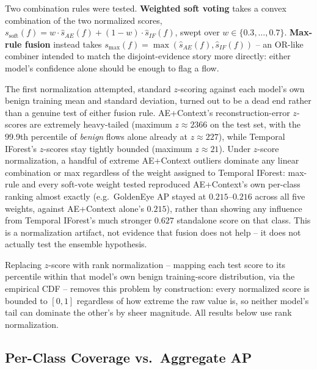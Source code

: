 Two combination rules were tested. \textbf{Weighted soft voting} takes a convex combination of the two normalized scores, $s_{\text{soft}}(f) = w \cdot \hat{s}_{AE}(f) + (1-w) \cdot \hat{s}_{IF}(f)$, swept over $w \in \{0.3, \dots, 0.7\}$. \textbf{Max-rule fusion} instead takes $s_{\text{max}}(f) = \max(\hat{s}_{AE}(f), \hat{s}_{IF}(f))$ -- an OR-like combiner intended to match the disjoint-evidence story more directly: either model's confidence alone should be enough to flag a flow.

The first normalization attempted, standard $z$-scoring against each model's own benign training mean and standard deviation, turned out to be a dead end rather than a genuine test of either fusion rule. AE+Context's reconstruction-error $z$-scores are extremely heavy-tailed (maximum $z \approx 2366$ on the test set, with the 99.9th percentile of \emph{benign} flows alone already at $z \approx 227$), while Temporal IForest's $z$-scores stay tightly bounded (maximum $z \approx 21$). Under $z$-score normalization, a handful of extreme AE+Context outliers dominate any linear combination or max regardless of the weight assigned to Temporal IForest: max-rule and every soft-vote weight tested reproduced AE+Context's own per-class ranking almost exactly (e.g.\ GoldenEye AP stayed at $0.215$--$0.216$ across all five weights, against AE+Context alone's $0.215$), rather than showing any influence from Temporal IForest's much stronger $0.627$ standalone score on that class. This is a normalization artifact, not evidence that fusion does not help -- it does not actually test the ensemble hypothesis.

Replacing $z$-score with rank normalization -- mapping each test score to its percentile within that model's own benign training-score distribution, via the empirical CDF -- removes this problem by construction: every normalized score is bounded to $[0,1]$ regardless of how extreme the raw value is, so neither model's tail can dominate the other's by sheer magnitude. All results below use rank normalization.

\subsection{Per-Class Coverage vs.\ Aggregate AP}
\label{sec:explain-ensemble-results}

